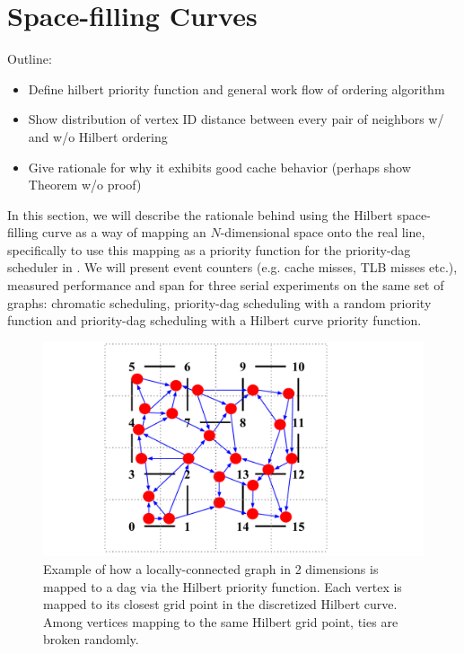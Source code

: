\section{Space-filling Curves}
\label{sec:hilbert}

Outline:
\begin{itemize}
\item Define hilbert priority function and general work flow of ordering algorithm
\item Show distribution of vertex ID distance between every pair of neighbors w/ and w/o Hilbert ordering
\item Give rationale for why it exhibits good cache behavior (perhaps show Theorem w/o proof)
\end{itemize}



In this section, we will describe the rationale behind using the
Hilbert space-filling curve as a way of mapping an $N$-dimensional
space onto the real line, specifically to use this mapping as a
priority function for the priority-dag scheduler in .
We will present event counters (e.g. cache misses, TLB misses etc.), 
measured performance and span for three serial experiments on the same
set of graphs: chromatic scheduling, priority-dag scheduling with
a random priority function and priority-dag scheduling with a
Hilbert curve priority function.  

\begin{figure}[h]
\centering
\includegraphics[width=5in]{hilbert_priority_function.pdf}
\caption{Example of how a locally-connected graph in 2 dimensions
is mapped to a dag via the Hilbert priority function.  Each
vertex is mapped to its closest grid point in the discretized
Hilbert curve.  Among vertices mapping to the same Hilbert grid
point, ties are broken randomly.}
\label{fig:}
\end{figure}



